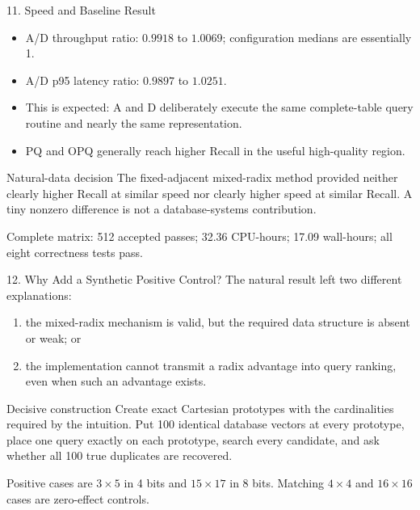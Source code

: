 \documentclass[aspectratio=169]{beamer}
\begin{document}
\begin{frame}{11. Speed and Baseline Result}
\begin{itemize}
  \item A/D throughput ratio: \(0.9918\) to \(1.0069\); configuration medians are
  essentially 1.
  \item A/D p95 latency ratio: \(0.9897\) to \(1.0251\).
  \item This is expected: A and D deliberately execute the same complete-table
  query routine and nearly the same representation.
  \item PQ and OPQ generally reach higher Recall in the useful high-quality
  region.
\end{itemize}
\begin{alertblock}{Natural-data decision}
The fixed-adjacent mixed-radix method provided neither clearly higher Recall
at similar speed nor clearly higher speed at similar Recall. A tiny nonzero
difference is not a database-systems contribution.
\end{alertblock}
\scriptsize Complete matrix: 512 accepted passes; 32.36 CPU-hours;
17.09 wall-hours; all eight correctness tests pass.
\end{frame}

\begin{frame}{12. Why Add a Synthetic Positive Control?}
The natural result left two different explanations:
\begin{enumerate}
  \item the mixed-radix mechanism is valid, but the required data structure is
  absent or weak; or
  \item the implementation cannot transmit a radix advantage into query
  ranking, even when such an advantage exists.
\end{enumerate}
\begin{block}{Decisive construction}
Create exact Cartesian prototypes with the cardinalities required by the
intuition. Put 100 identical database vectors at every prototype, place one
query exactly on each prototype, search every candidate, and ask whether all
100 true duplicates are recovered.
\end{block}
Positive cases are \(3\times5\) in 4 bits and \(15\times17\) in 8 bits.
Matching \(4\times4\) and \(16\times16\) cases are zero-effect controls.
\end{frame}
\end{document}
